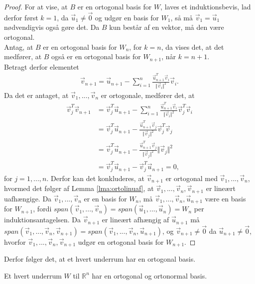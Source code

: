 \begin{proof}
For at  vise, at $B$ er en ortogonal basis for $W$, laves et induktionsbevis, lad derfor først $k= 1$, da $\vec{u}_1\neq \vec{0}$ og udgør en basis for $W_1$, så må $\vec{v}_1 = \vec{u}_1$ nødvendigvis også gøre det.
Da $B$ kun består af en vektor, må den være ortogonal.
\\Antag, at $B$ er en ortogonal basis for $W_n$, for $k=n$, da vises det, at det medfører, at $B$ også er en ortogonal basis for  $W_{n+1}$, når $k = n+1$.
\\Betragt derfor elementet 
\begin{align*}
\vec{v}_{n+1} = \vec{u}_{n+1} - \sum_{i=1}^n \frac{\vec{u}_{n+1}^T\vec{v}_i}{\Vert\vec{v}_i\Vert^2}\vec{v}_i.
\end{align*}
Da det er antaget, at $\vec{v}_1,...,\vec{v}_n$ er ortogonale, medfører det, at
\begin{align*}
\vec{v}_j^T\vec{v}_{n+1} &= \vec{v}_j^T\vec{u}_{n+1} - \sum_{i=1}^n \frac{\vec{u}_{n+1}^T\vec{v}_i}{\Vert\vec{v}_i\Vert^2}\vec{v}_j^T\vec{v}_i
\\ &= \vec{v}_j^T\vec{u}_{n+1} - \frac{\vec{u}_{n+1}^T\vec{v}_j}{\Vert\vec{v}_j\Vert^2}\vec{v}_j^T\vec{v}_j
\\ & = \vec{v}_j^T\vec{u}_{n+1} -  \frac{\vec{u}_{n+1}^T\vec{v}_j}{\Vert\vec{v}_j\Vert^2}\Vert\vec{v}_j\Vert^2
\\ & =\vec{v}_j^T\vec{u}_{n+1} - \vec{v}_j^T\vec{u}_{n+1} = 0 , 
\end{align*}
for $j = 1,...,n$. 
Derfor kan det konkluderes, at $\vec{v}_{n+1}$ er ortogonal med $\vec{v}_1,...,\vec{v}_n$, hvormed det følger af Lemma \ref{lma:ortolinuaf}, at $\vec{v}_1,...,\vec{v}_n, \vec{v}_{n+1}$ er lineært uafhængige.
Da $\vec{v}_1,...,\vec{v}_n$ er en basis for $W_n$, må $\vec{v}_1,...,\vec{v}_n, \vec{u}_{n+1}$ være en basis for $W_{n+1}$, fordi $span(\vec{v}_1,...,\vec{v}_n) = span(\vec{u}_1,...,\vec{u}_n) = W_n$ per induktionsantagelsen. 
Da $\vec{v}_{n+1}$ er lineært afhængig af $\vec{u}_{n+1}$ må $span(\vec{v}_1,...,\vec{v}_n, \vec{v}_{n+1}) = span(\vec{v}_1,...,\vec{v}_n, \vec{u}_{n+1})$, og $\vec{v}_{n+1} \neq \vec{0}$ da $\vec{u}_{n+1} \neq \vec{0}$, hvorfor $\vec{v}_1,...,\vec{v}_n, \vec{v}_{n+1}$ udgør en ortogonal basis for $W_{n+1}$.
\end{proof}
Derfor følger det, at et hvert underrum har en ortogonal basis.
\begin{kor}
Et hvert underrum $W$ til $\mathds{R}^n$ har en ortogonal og ortonormal basis.
\end{kor}
